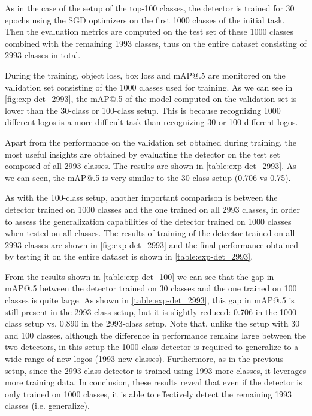 As in the case of the setup of the top-100 classes, the detector is trained for 30 epochs using the SGD optimizers on the first 1000 classes of the initial task. Then the evaluation metrics are computed on the test set of these 1000 classes combined with the remaining 1993 classes, thus on the entire dataset consisting of 2993 classes in total.

During the training, object loss, box loss and mAP@.5 are monitored on the validation set consisting of the 1000 classes used for training.
As we can see in \autoref{fig:exp-det_2993}, the mAP@.5 of the model computed on the validation set is lower than the 30-class or 100-class setup.
This is because recognizing 1000 different logos is a more difficult task than recognizing 30 or 100 different logos.

Apart from the performance on the validation set obtained during training, the most useful insights are obtained by evaluating the detector on the test set composed of all 2993 classes. The results are shown in \autoref{table:exp-det_2993}. As we can seen, the mAP@.5 is very similar to the 30-class setup (0.706 vs 0.75).

As with the 100-class setup, another important comparison is between the detector trained on 1000 classes and the one trained on all 2993 classes, in order to assess the generalization capabilities of the detector trained on 1000 classes when tested on all classes.
The results of training of the detector trained on all 2993 classes are shown in \autoref{fig:exp-det_2993} and the final performance obtained by testing it on the entire dataset is shown in \autoref{table:exp-det_2993}.

From the results shown in \autoref{table:exp-det_100} we can see that the gap in mAP@.5 between the detector trained on 30 classes and the one trained on 100 classes is quite large.
As shown in \autoref{table:exp-det_2993}, this gap in mAP@.5 is still present in the 2993-class setup, but it is slightly reduced: 0.706 in the 1000-class setup vs. 0.890 in the 2993-class setup.
Note that, unlike the setup with 30 and 100 classes, although the difference in performance remains large between the two detectors, in this setup the 1000-class detector is required to generalize to a wide range of new logos (1993 new classes).
Furthermore, as in the previous setup, since the 2993-class detector is trained using 1993 more classes, it leverages more training data.
In conclusion, these results reveal that even if the detector is only trained on 1000 classes, it is able to effectively detect the remaining 1993 classes (i.e. generalize).

